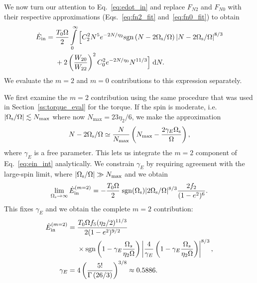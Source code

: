 \documentclass[
        fleqn,
        usenatbib,
    ]{mnras}
\newcommand*{\abs}[1]{\left|#1\right|}
\newcommand*{\p}[1]{\left(#1\right)}
\begin{document}
We now turn our attention to Eq.~\eqref{eq:edot_in} and replace $F_{N2}$ and
$F_{N0}$ with their respective approximations (Eqs.~\ref{eq:fn2_fit}
and~\ref{eq:fn0_fit}) to obtain
\begin{align}
    \dot{E}_{\rm in} ={}&
        \frac{T_0 \Omega}{2} \int\limits_0^\infty \Big[
            C_2^2 N^5 e^{-2N/\eta_2} \mathrm{sgn}\left(N - 2\Omega_{\rm s} /
                \Omega\right) \left|N - 2 \Omega_{\rm s} /
                \Omega\right|^{8/3}\nonumber\\
            &+ 2 \p{\frac{W_{20}}{W_{22}}}^2 C_0^2 e^{-2N / \eta_0} N^{11/3}
        \Big]\;\mathrm{d}N.\label{eq:ein_int}
\end{align}
We evaluate the $m = 2$ and $m = 0$ contributions to this expression separately.

We first examine the $m = 2$ contribution using the same procedure that was used
in Section~\ref{ss:torque_eval} for the torque. If the spin is moderate,
i.e.\ $\abs{\Omega_{\rm s} / \Omega} \lesssim N_{\max}$ where now $N_{\max} = 23
\eta_2 / 6$, we make the approximation
\begin{equation}
    N - 2\Omega_{\rm s} / \Omega \simeq \frac{N}{N_{\max}}
        \left(N_{\max} - \frac{2\gamma_E
        \Omega_{\rm s}}{\Omega}\right)\label{eq:nmax_ansatz},
\end{equation}
where $\gamma_E$ is a free parameter. This lets us integrate the $m = 2$
component of Eq.~\eqref{eq:ein_int} analytically. We constrain $\gamma_E$
by requiring agreement with the large-spin limit, where $\abs{\Omega_{\rm s} /
\Omega} \gg N_{\max}$ and we obtain
\begin{equation}
    \lim_{\Omega_{\rm s} \to \infty} \dot{E}_{\rm in}^{(m=2)} =
        -\frac{T_0\Omega}{2} \; \mathrm{sgn}(\Omega_{\rm s})|2\Omega_{\rm
        s}/\Omega|^{8/3} \frac{2f_2}{(1 - e^2)^6}.\label{eq:ein_highs}
\end{equation}
This fixes $\gamma_E$ and we obtain the complete $m = 2$ contribution:
\begin{align}
    \dot{E}_{\rm in}^{(m=2)}
        ={}& \frac{T_0\Omega f_5 (\eta_2/2)^{11/3}}{2(1-e^2)^{9/2}}
            \nonumber\\
        &\times \mathrm{sgn}\p{1 - \gamma_E\frac{\Omega_s}{\eta_2 \Omega}}
            \left|
                \frac{4}{\gamma_E}
                \p{1 - \gamma_E\frac{\Omega_s}{\eta_2 \Omega}}
            \right|^{8/3},\\
    \gamma_E ={}& 4\p{\frac{5!}{\Gamma\p{26/3}}}^{3/8}
        \approx 0.5886.
\end{align}
\end{document}
